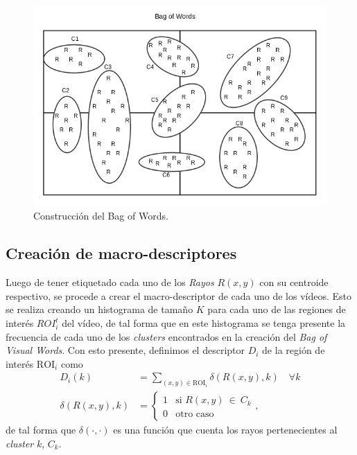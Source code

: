 	\begin{figure}[tb]
		\centering
    		\includegraphics[width=1\textwidth]{Figuras/Diagramas/bow_solo.png}
  		\caption{Construcción del Bag of Words.}
  		\label{algoritmo:fig:bow}
	\end{figure}	

	\subsection{Creación de macro-descriptores}
	\label{algoritmo:crea_macro-descriptores}
	Luego de tener etiquetado cada uno de los \textit{Rayos} $R(x,y)$ con su centroide respectivo, se procede a crear el macro-descriptor de cada uno de los vídeos.	 Esto se realiza creando un histograma de tamaño $K$ para cada uno de las regiones de interés ${ROI}_{i}^{t}$ del vídeo, de tal forma que en este histograma se tenga presente la frecuencia de cada uno de los \textit{clusters} encontrados en la creación del \textit{Bag of Visual Words}. Con esto presente, definimos el descriptor $D_i$ de la región de interés $\text{ROI}_i$ como
	\begin{align}
		\label{algoritmo:eq:hist}
		D_i(k) &= \sum_{(x,y)\in \text{ROI}_i} \delta (R(x,y),k) \quad \forall k\\
		\label{algoritmo:eq:fun_hist}
		 \delta (R(x,y),k) &= \begin{cases}
		 1 & \mbox{si }R(x,y)~\in~C_k\\
     0 & \text{otro caso}
     \end{cases},
	\end{align}
de tal forma que $\delta(\cdot,\cdot)$ es una función que cuenta los rayos pertenecientes al \textit{cluster} $k$, $C_k$.


